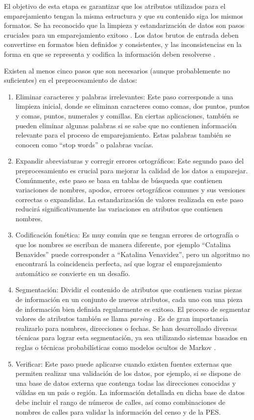 \documentclass[
  12pt,
]{book}
\begin{document}
El objetivo de esta etapa es garantizar que los atributos utilizados para el emparejamiento tengan la misma estructura y que su contenido siga los mismos formatos. Se ha reconocido que la limpieza y estandarización de datos son pasos cruciales para un emparejamiento exitoso \citep{herzog2007data}. Los datos brutos de entrada deben convertirse en formatos bien definidos y consistentes, y las inconsistencias en la forma en que se representa y codifica la información deben resolverse \citep{churches2002preparation}.

Existen al menos cinco pasos que son necesarios (aunque probablemente no suficientes) en el preprocesamiento de datos:

\begin{enumerate}
\def\labelenumi{\arabic{enumi}.}
\item
  Eliminar caracteres y palabras irrelevantes: Este paso corresponde a una limpieza inicial, donde se eliminan caracteres como comas, dos puntos, puntos y comas, puntos, numerales y comillas. En ciertas aplicaciones, también se pueden eliminar algunas palabras si se sabe que no contienen información relevante para el proceso de emparejamiento. Estas palabras también se conocen como ``stop words'' o palabras vacías.
\item
  Expandir abreviaturas y corregir errores ortográficos: Este segundo paso del preprocesamiento es crucial para mejorar la calidad de los datos a emparejar. Comúnmente, este paso se basa en tablas de búsqueda que contienen variaciones de nombres, apodos, errores ortográficos comunes y sus versiones correctas o expandidas. La estandarización de valores realizada en este paso reducirá significativamente las variaciones en atributos que contienen nombres.
\item
  Codificación fonética: Es muy común que se tengan errores de ortografía o que los nombres se escriban de manera diferente, por ejemplo ``Catalina Benavides'' puede corresponder a ``Katalina Venavidez'', pero un algoritmo no encontrará la coincidencia perfecta, así que lograr el emparejamiento automático se convierte en un desafío.
\item
  Segmentación: Dividir el contenido de atributos que contienen varias piezas de información en un conjunto de nuevos atributos, cada uno con una pieza de información bien definida regularmente es exitoso. El proceso de segmentar valores de atributos también se llama \emph{parsing} \citep{herzog2007data}. Es de gran importancia realizarlo para nombres, direcciones o fechas. Se han desarrollado diversas técnicas para lograr esta segmentación, ya sea utilizando sistemas basados en reglas o técnicas probabilísticas como modelos ocultos de Markov \citep{churches2002preparation}.
\item
  Verificar: Este paso puede aplicarse cuando existen fuentes externas que permiten realizar una validación de los datos, por ejemplo, si se dispone de una base de datos externa que contenga todas las direcciones conocidas y válidas en un país o región. La información detallada en dicha base de datos debe incluir el rango de números de calles, así como combinaciones de nombres de calles para validar la información del censo y de la PES.
\end{enumerate}
\end{document}
